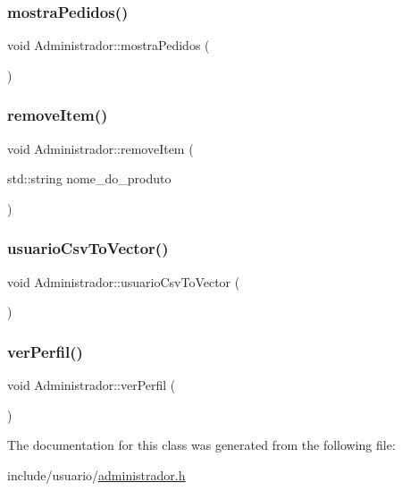 \subsubsection{\texorpdfstring{mostra\+Pedidos()}{mostraPedidos()}}
{\footnotesize\ttfamily void Administrador\+::mostra\+Pedidos (\begin{DoxyParamCaption}{ }\end{DoxyParamCaption})}

\mbox{\label{class_administrador_ac3032625947549cda5dd58fa7a8a1544}} 
\subsubsection{\texorpdfstring{remove\+Item()}{removeItem()}}
{\footnotesize\ttfamily void Administrador\+::remove\+Item (\begin{DoxyParamCaption}\item[{std\+::string}]{nome\+\_\+do\+\_\+produto }\end{DoxyParamCaption})}

\mbox{\label{class_administrador_a1c98197c9a5aaa38a4ec7bb37d19f8b6}} 
\subsubsection{\texorpdfstring{usuario\+Csv\+To\+Vector()}{usuarioCsvToVector()}}
{\footnotesize\ttfamily void Administrador\+::usuario\+Csv\+To\+Vector (\begin{DoxyParamCaption}{ }\end{DoxyParamCaption})}

\mbox{\label{class_administrador_ad44fa015e8adccab79067f47e0f679b6}} 
\subsubsection{\texorpdfstring{ver\+Perfil()}{verPerfil()}}
{\footnotesize\ttfamily void Administrador\+::ver\+Perfil (\begin{DoxyParamCaption}{ }\end{DoxyParamCaption})}



The documentation for this class was generated from the following file\+:\begin{DoxyCompactItemize}
\item 
include/usuario/\hyperlink{administrador_8h}{administrador.\+h}\end{DoxyCompactItemize}
